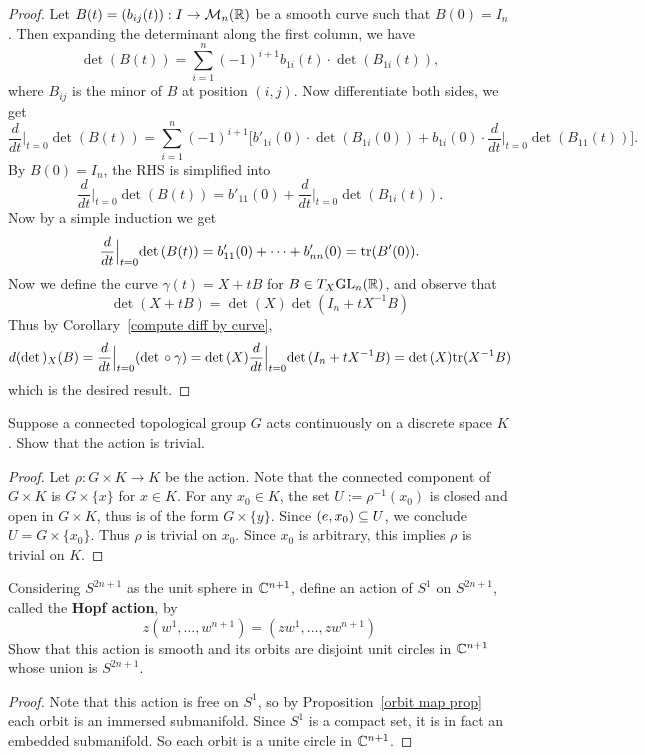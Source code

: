 \begin{proof}
Let $B(t)=(b_{ij}(t)):I\to\mathcal{M}_n(\mathbb{R})$ be a smooth curve such that $B(0)=I_n$. Then expanding the determinant along the first column, we have
\[\det(B(t))=\sum_{i=1}^{n}(-1)^{i+1}b_{1i}(t)\cdot\det(B_{1i}(t)),\]
where $B_{ij}$ is the minor of $B$ at position $(i,j)$. Now differentiate both sides, we get
\[\frac{d}{dt}\Big|_{t=0}\det(B(t))=\sum_{i=1}^{n}(-1)^{i+1}\Big[b'_{1i}(0)\cdot\det(B_{1i}(0))+b_{1i}(0)\cdot\frac{d}{dt}\Big|_{t=0}\det(B_{11}(t))\Big].\]
By $B(0)=I_n$, the RHS is simplified into
\[\frac{d}{dt}\Big|_{t=0}\det(B(t))=b'_{11}(0)+\frac{d}{dt}\Big|_{t=0}\det(B_{1i}(t)).\]
Now by a simple induction we get
\[\frac{d}{dt}\Big|_{t=0}\mathrm{det}\,(B(t))=b'_{11}(0)+\cdots+b'_{nn}(0)=\mathrm{tr}(B'(0)).\]
Now we define the curve $\gamma(t)=X+tB$ for $B\in T_X\mathrm{GL}_n(\mathbb{R})$, and observe that
\[\det(X+tB)=\det(X)\det(I_n+tX^{-1}B)\]
Thus by Corollary~\ref{compute diff by curve},
\[d(\mathrm{det}\,)_X(B)=\frac{d}{dt}\Big|_{t=0}(\mathrm{det}\,\circ\gamma)=\mathrm{det}\,(X)\frac{d}{dt}\Big|_{t=0}\mathrm{det}\,(I_n+tX^{-1}B)=\mathrm{det}\,(X)\mathrm{tr}(X^{-1}B)\]
which is the desired result.
\end{proof}
\begin{exercise}
Suppose a connected topological group $G$ acts continuously on a discrete space $K$. Show that the action is trivial. 
\end{exercise}
\begin{proof}
Let $\rho:G\times K\to K$ be the action. Note that the connected component of $G\times K$ is $G\times\{x\}$ for $x\in K$. For any $x_0\in K$, the set $U:=\rho^{-1}(x_0)$ is closed and open in $G\times K$, thus is of the form $G\times\{y\}$. Since $(e,x_0)\subseteq U$, we conclude $U=G\times\{x_0\}$. Thus $\rho$ is trivial on $x_0$. Since $x_0$ is arbitrary, this implies $\rho$ is trivial on $K$.
\end{proof}
\begin{exercise}
Considering $S^{2n+1}$ as the unit sphere in $\mathbb{C}^{n+1}$, define an action of $S^1$ on $S^{2n+1}$, called the \textbf{Hopf action}, by
\[z(w^1,\dots,w^{n+1})=(zw^1,\dots,zw^{n+1})\]
Show that this action is smooth and its orbits are disjoint unit circles in $\mathbb{C}^{n+1}$ whose union is $S^{2n+1}$.
\end{exercise}
\begin{proof}
Note that this action is free on $S^1$, so by Proposition~\ref{orbit map prop} each orbit is an immersed submanifold. Since $S^1$ is a compact set, it is in fact an embedded submanifold. So each orbit is a unite circle in $\mathbb{C}^{n+1}$.
\end{proof}
